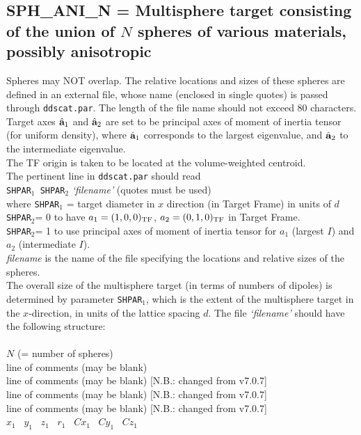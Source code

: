 \subsection{ SPH\_ANI\_N = Multisphere target consisting of the union of $N$
	    spheres of various materials, possibly anisotropic
            \label{sec:SPH_ANI_N}}
	Spheres may NOT overlap.
	The relative locations and sizes of these spheres are
	defined in an external file, whose name (enclosed in single quotes)
	is passed through {\tt ddscat.par}.  The length of the file name
	should not exceed 80 characters.
	Target axes $\hat{\bf a}_1$ and $\hat{\bf a}_2$ are set to
	be principal axes of moment of inertia tensor (for uniform density), 
	where $\hat{\bf a}_1$
	corresponds to the largest eigenvalue, and $\hat{\bf a}_2$ to the
	intermediate eigenvalue.\\
	The TF origin is taken to be located at the volume-weighted
	centroid.\\
	The pertinent line in {\tt ddscat.par} should read\\
	{\tt SHPAR$_1$ SHPAR$_2$} {\it `filename'} (quotes must be used)\\
	where {\tt SHPAR$_1$} = target diameter in $x$ direction 
	(in Target Frame) in units of $d$\\
	{\tt SHPAR$_2$}= 0 to have $a_1=(1,0,0)_{\rm TF}$, $a_2=(0,1,0)_{\rm TF}$ 
	in Target Frame.\\
	{\tt SHPAR$_2$}= 1 to use principal axes of moment of inertia
	tensor for $a_1$ (largest $I$) and $a_2$ (intermediate $I$).\\
	{\it filename} is the name of the file specifying the locations and
	relative sizes of the spheres.\\
	The overall size of the multisphere target (in terms of numbers of
	dipoles) is determined by parameter {\tt SHPAR$_1$}, which is
	the extent of the multisphere target in the $x$-direction, in
	units of the lattice spacing $d$.
	The file {\it `filename'} should have the
	following structure:\\ \\
	 $N$ (= number of spheres)\\
	 line of comments (may be blank)\\
		 line of comments (may be blank) [N.B.: changed from v7.0.7]\\
	 line of comments (may be blank) [N.B.: changed from v7.0.7]\\
	 line of comments (may be blank) [N.B.: changed from v7.0.7]\\
         $x_1$~ $y_1$~ $z_1$~ $r_1$~ $Cx_1$~ $Cy_1$~ $Cz_1$~ 
